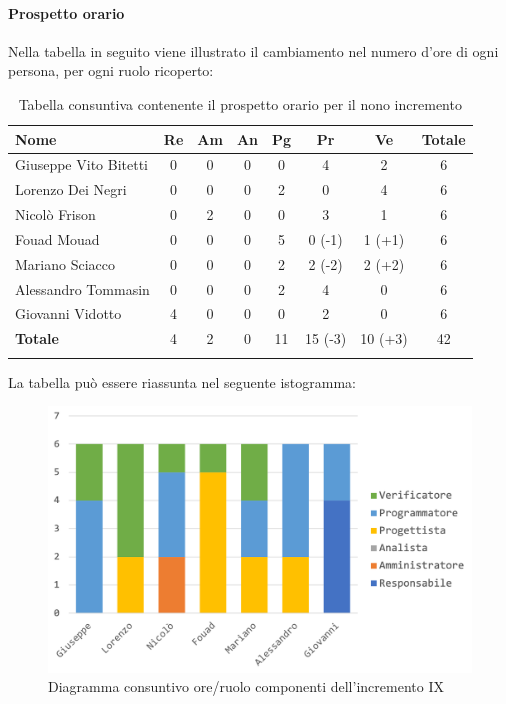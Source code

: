 		\paragraph{Prospetto orario}
			Nella tabella in seguito viene illustrato il cambiamento nel numero d'ore di ogni persona, per ogni ruolo ricoperto:
		
		\begin{longtable}{|l|c|c|c|c|c|c|c|}
			\hline
			\rowcolor{lighter-grayer}
			\textbf{Nome} & \textbf{Re} & \textbf{Am} & \textbf{An} & \textbf{Pg}  & \textbf{Pr}   & \textbf{Ve} & \textbf{Totale} \\
			\hline
			\endfirsthead
			
			\hline
			Giuseppe Vito Bitetti 		 & 0 & 0 & 0 & 0 & 4 & 2 & 6\\
			\hline
			\hline
			Lorenzo Dei Negri			 & 0 & 0 & 0 & 2 & 0 & 4 & 6\\
			\hline
			\hline
			Nicolò Frison				      & 0 & 2 & 0 & 0 & 3 & 1 & 6\\
			\hline
			\hline
			Fouad Mouad 				   & 0 & 0 & 0 & 5 & 0 (-1) & 1 (+1) & 6\\
			\hline
			\hline
			Mariano Sciacco 			 & 0 & 0 & 0 & 2 & 2 (-2) & 2 (+2) & 6\\
			\hline
			\hline
			Alessandro Tommasin    & 0 & 0 & 0 & 2 & 4 & 0 & 6\\
			\hline
			\hline
			Giovanni Vidotto 			  & 4 & 0 & 0 & 0 & 2 & 0 & 6\\
			\hline 
			\textbf{Totale}			 		& 4 & 2 & 0 & 11 & 15 (-3) & 10 (+3) & 42\\
			\hline
			\caption{Tabella consuntiva contenente il prospetto orario per il nono incremento}
		\end{longtable}
		
		La tabella può essere riassunta nel seguente istogramma:
		
		\begin{figure}[H]
			\centering
			\includegraphics[width=0.8\linewidth]{images/consuntivo/ConsIncr9-1.png}
			\caption{Diagramma consuntivo ore/ruolo componenti dell'incremento IX}
			\label{fig:consuntivo diagramma suddivisione ruoli incremento IX}
		\end{figure}
		
